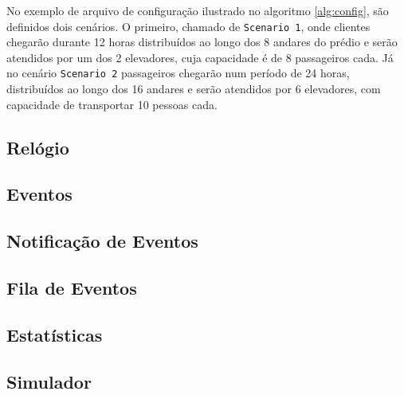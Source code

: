 No exemplo de arquivo de configuração ilustrado no algoritmo \ref{alg:config},
são definidos dois cenários. O primeiro, chamado de \texttt{Scenario 1}, onde
clientes chegarão durante 12 horas distribuídos ao longo dos 8 andares do prédio
e serão atendidos por um dos 2 elevadores, cuja capacidade é de 8 passageiros
cada. Já no cenário \texttt{Scenario 2} passageiros chegarão num período de 24
horas, distribuídos ao longo dos 16 andares e serão atendidos por 6 elevadores,
com capacidade  de transportar 10 pessoas cada.

\subsection{\label{simulator:model:clock}Relógio}
\lipsum[1]

\subsection{\label{simulator:model:events}Eventos}
\lipsum[1]

\subsection{\label{simulator:model:notification}Notificação de Eventos}
\lipsum[1]

\subsection{\label{simulator:model:queue}Fila de Eventos}
\lipsum[1]

\subsection{\label{simulator:model:statistics}Estatísticas}
\lipsum[1]

\subsection{\label{simulator:model:simulator}Simulador}
\lipsum[1]
